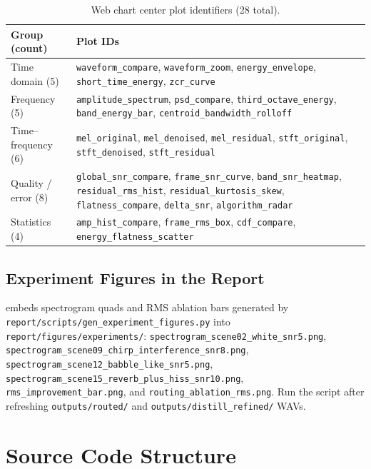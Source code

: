 \begin{table}[H]
  \centering
  \caption{Web chart center plot identifiers (28 total).}
  \label{tab:web_plots}
  \footnotesize
  \begin{tabularx}{\textwidth}{l X}
    \toprule
    \textbf{Group (count)} & \textbf{Plot IDs} \\
    \midrule
    Time domain (5) &
    \texttt{waveform\_compare}, \texttt{waveform\_zoom}, \texttt{energy\_envelope}, \texttt{short\_time\_energy}, \texttt{zcr\_curve} \\
    Frequency (5) &
    \texttt{amplitude\_spectrum}, \texttt{psd\_compare}, \texttt{third\_octave\_energy}, \texttt{band\_energy\_bar}, \texttt{centroid\_bandwidth\_rolloff} \\
    Time--frequency (6) &
    \texttt{mel\_original}, \texttt{mel\_denoised}, \texttt{mel\_residual}, \texttt{stft\_original}, \texttt{stft\_denoised}, \texttt{stft\_residual} \\
    Quality / error (8) &
    \texttt{global\_snr\_compare}, \texttt{frame\_snr\_curve}, \texttt{band\_snr\_heatmap}, \texttt{residual\_rms\_hist}, \texttt{residual\_kurtosis\_skew}, \texttt{flatness\_compare}, \texttt{delta\_snr}, \texttt{algorithm\_radar} \\
    Statistics (4) &
    \texttt{amp\_hist\_compare}, \texttt{frame\_rms\_box}, \texttt{cdf\_compare}, \texttt{energy\_flatness\_scatter} \\
    \bottomrule
  \end{tabularx}
\end{table}

\section{Experiment Figures in the Report}

 embeds spectrogram quads and RMS ablation bars generated by \texttt{report/scripts/gen\_experiment\_figures.py} into \texttt{report/figures/experiments/}:
\texttt{spectrogram\_scene02\_white\_snr5.png},
\texttt{spectrogram\_scene09\_chirp\_interference\_snr8.png},
\texttt{spectrogram\_scene12\_babble\_like\_snr5.png},
\texttt{spectrogram\_scene15\_reverb\_plus\_hiss\_snr10.png},
\texttt{rms\_improvement\_bar.png}, and \texttt{routing\_ablation\_rms.png}.
Run the script after refreshing \texttt{outputs/routed/} and \texttt{outputs/distill\_refined/} WAVs.

\chapter{Source Code Structure}
\label{app:code}


